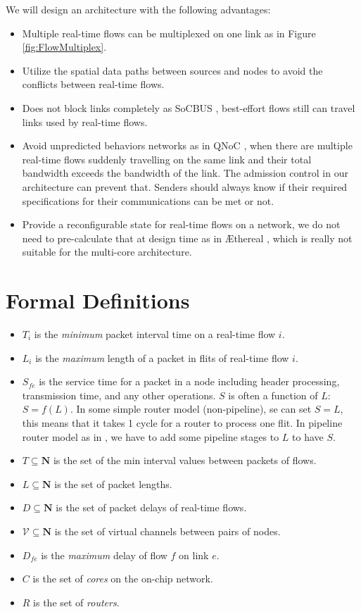 \documentclass[10pt]{article}
\begin{document}
We will design an architecture with the following advantages:
\begin{itemize}
\item Multiple real-time flows can be multiplexed on one link
\cite{Ferrari90ascheme} as in Figure \ref{fig:FlowMultiplex}.
\item Utilize the spatial data paths between sources and nodes to avoid the 
conflicts between real-time flows.
\item Does not block links completely as SoCBUS \cite{SoCBUS}, best-effort flows 
still can travel links used by real-time flows.
\item Avoid unpredicted behaviors networks as in QNoC \cite{QNoC}, when there are 
multiple real-time flows suddenly travelling on the same link and their total bandwidth 
exceeds the bandwidth of the link. The admission control in our architecture can 
prevent that. Senders should always know if their required specifications for 
their communications can be met or not. 
\item Provide a reconfigurable state for real-time flows on a network, we do not 
need to pre-calculate that at design time as in \AE thereal \cite{Goossens_chapter4}, 
which is really not suitable for the multi-core architecture.
\end{itemize}
\section{Formal Definitions}
\begin{itemize}
\item $T_i$ is the {\em minimum} packet interval time on a real-time flow $i$.
\item $L_i$ is the {\em maximum} length of a packet in flits of real-time flow $i$.
\item $S_{fe}$ is the service time for a packet in a node including header 
processing, transmission time, and any other operations. $S$ is often a 
function of $L$: $S=f(L)$. In some simple router model (non-pipeline), se can set $S=L$, this means that
it takes 1 cycle for a router to process one flit. In pipeline router model as 
in \cite{PehDelayModel, PehSpecPipeR}, we have to add some pipeline 
stages to $L$ to have $S$. 
\item $T \subseteq \mathbf{N}$ is the set of the min interval values between packets of flows. 
\item $L \subseteq \mathbf{N}$ is the set of packet lengths.
\item $D \subseteq \mathbf{N}$ is the set of packet delays of real-time flows.
\item $\mathcal{V} \subseteq \mathbf{N}$ is the set of virtual channels between pairs of nodes. 
\item $D_{fe}$ is the {\em maximum} delay of flow $f$ on link $e$.
\item $C$ is the set of {\em cores} on the on-chip network.
\item $R$ is the set of {\em routers}.
\end{itemize}
\end{document}
